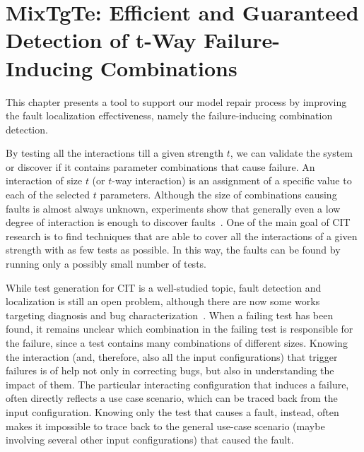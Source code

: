 \begin{tikzborder}{\cite{Gargantini16:validation}}
\begin{tikzborder}{\cite{gargantini_combinatorial_2017}}
\begin{tikzborder}{\cite{gargantini_combinatorial_2017}}
\begin{tikzborder}{\cite{garn2019}}
\begin{tikzborder}{\cite{arcaini2019achieving}}
\chapter{MixTgTe: Efficient and Guaranteed Detection of t-Way Failure-Inducing Combinations}\label{ch:mix}


%	
This chapter presents a tool to support our model repair process by improving the fault localization effectiveness, namely the failure-inducing combination detection.

By testing all the interactions till a given strength $t$, we can validate the system or discover if it contains parameter combinations that cause failure. An interaction of size $t$ (or $t$-way interaction) is an assignment of a specific value to each of the selected $t$ parameters. Although the size of combinations causing faults is almost always unknown, experiments show that generally even a low degree of interaction is enough to discover faults~\cite{kuhncomputer09}. One of the main goal of CIT research is to find techniques that are able to cover all the interactions of a given strength with as few tests as possible. In this way, the faults can be found by running only a possibly small number of tests.

While test generation for CIT is a well-studied topic, fault detection and localization is still an open problem, although there are now some works targeting diagnosis and bug characterization~\cite{satapathy_approaches_2018}. When a failing test has been found, it remains unclear which combination in the failing test is responsible for the failure, since a test contains many combinations of different sizes. Knowing the interaction (and, therefore, also all the input configurations) that trigger failures is of help not only in correcting bugs, but also in understanding the impact of them. The particular interacting configuration that induces a failure, often directly reflects a use case scenario, which can be traced back from the input configuration. Knowing only the test that causes a fault, instead, often makes it impossible to trace back to the general use-case scenario (maybe involving several other input configurations) that caused the fault.


\end{tikzborder}
\end{tikzborder}
\end{tikzborder}
\end{tikzborder}
\end{tikzborder}
